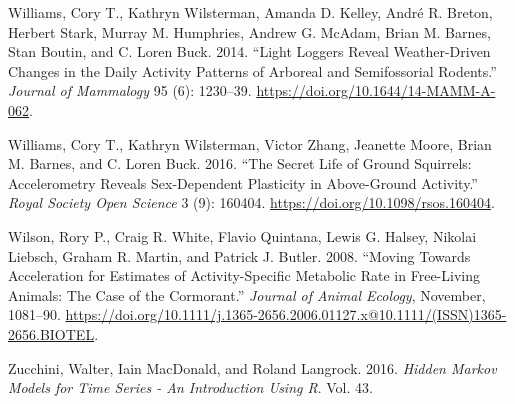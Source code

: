 \documentclass[english,msc,numbers,hidelinks]{coppe}
\newlength{\cslhangindent}
\newenvironment{CSLReferences}[2] %
 {%
  \setlength{\parindent}{0pt}
  \ifodd #1 \everypar{\setlength{\hangindent}{\cslhangindent}}\ignorespaces\fi
  \ifnum #2 > 0
  \setlength{\parskip}{#2\baselineskip}
  \fi
 }%
 {}
\begin{document}
\begin{CSLReferences}{1}{0}
  \leavevmode{}%
  Williams, Cory T., Kathryn Wilsterman, Amanda D. Kelley, André R. Breton, Herbert Stark, Murray M. Humphries, Andrew G. McAdam, Brian M. Barnes, Stan Boutin, and C. Loren Buck. 2014. {``Light Loggers Reveal Weather-Driven Changes in the Daily Activity Patterns of Arboreal and Semifossorial Rodents.''} \emph{Journal of Mammalogy} 95 (6): 1230--39. \url{https://doi.org/10.1644/14-MAMM-A-062}.

  \leavevmode{}%
  Williams, Cory T., Kathryn Wilsterman, Victor Zhang, Jeanette Moore, Brian M. Barnes, and C. Loren Buck. 2016. {``The Secret Life of Ground Squirrels: Accelerometry Reveals Sex-Dependent Plasticity in Above-Ground Activity.''} \emph{Royal Society Open Science} 3 (9): 160404. \url{https://doi.org/10.1098/rsos.160404}.

  \leavevmode{}%
  Wilson, Rory P., Craig R. White, Flavio Quintana, Lewis G. Halsey, Nikolai Liebsch, Graham R. Martin, and Patrick J. Butler. 2008. {``Moving Towards Acceleration for Estimates of Activity-Specific Metabolic Rate in Free-Living Animals: The Case of the Cormorant.''} \emph{Journal of Animal Ecology}, November, 1081--90. \url{https://doi.org/10.1111/j.1365-2656.2006.01127.x@10.1111/(ISSN)1365-2656.BIOTEL}.

  \leavevmode{}%
  Zucchini, Walter, Iain MacDonald, and Roland Langrock. 2016. \emph{Hidden Markov Models for Time Series - An Introduction Using R}. Vol. 43.

  \end{CSLReferences}
\end{document}
